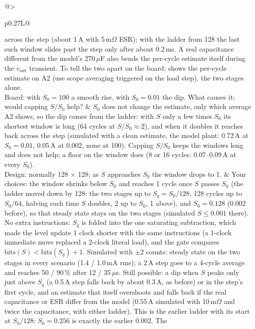 \documentclass[11pt]{article}
\newcommand{\code}[1]{\texttt{\detokenize{#1}}}
\begin{document}
{\begin{xltabular}{\linewidth}{@{}>{\raggedright\arraybackslash}p{0.27\linewidth}L@{}}
    across the step (about 1\,A with 5\,m$\Omega$ ESR); with the ladder
    from 128 the last such window slides past the step only after about
    0.2\,ms. A real capacitance different from the model's 270\,$\mu$F
    also bends the per-cycle estimate itself during the $v_\mathrm{out}$
    transient. To tell the two apart on the board: \code{tune.iload_s0 =
    0} shows the per-cycle estimate on A2 (use scope averaging triggered
    on the load step), \code{tune.iload_s0 = 1e30} the two stages
    alone. \\
Board: with $S_0 = 100$ a smooth rise, with $S_0 = 0.01$ the dip. What
causes it; would capping $S/S_0$ help?
  & $S_0$ does not change the estimate, only which average A2 shows, so
    the dip comes from the ladder: with $S$ only a few times $S_0$ its
    shortest window is long (64 cycles at $S/S_0\approx 2$), and when it
    doubles it reaches back across the step (simulated with a clean
    estimate, the model plant: 0.72\,A at $S_0=0.01$, 0.05\,A at 0.002,
    none at 100).
    Capping $S/S_0$ keeps the windows long and does not help; a floor on
    the window does (8 or 16 cycles: 0.07--0.09\,A at every $S_0$). \\
Design: normally 128 $\times$ 128; as $S$ approaches $S_0$ the window
drops to 1.
  & Your choices: the window shrinks below $S_0$ and reaches 1 cycle
    once $S$ passes $S_0$ (the ladder moved down by 128: the two stages
    up to $S_q=S_0/128$, 128 cycles up to $S_0/64$, halving each time $S$
    doubles, 2 up to $S_0$, 1 above), and $S_0 = 0.128$ (0.002 before),
    so that steady state stays on the two stages (simulated $S\le 0.001$
    there). No extra instructions: $S_q$ is folded into the one saturating
    subtraction, which made the level update 1 clock shorter with the same
    instructions (a 1-clock immediate move replaced a 2-clock literal
    load), and the gate compares
    $\mathrm{bits}(S) < \mathrm{bits}(S_q)+1$. Simulated with $\pm2$
    counts: steady state on the two stages in every scenario (1.4 /
    1.0\,mA rms); a 2\,A step goes to a 4-cycle average and reaches 50 /
    90\,\% after 12 / 35\,$\mu$s. Still possible: a dip when $S$ peaks only
    just above $S_q$ (a 0.5\,A step falls back by about 0.3\,A, as
    before) or in the step's first cycle, and an estimate that itself
    overshoots and falls back if the real capacitance or ESR differ from
    the model (0.55\,A simulated with 10\,m$\Omega$ and twice the
    capacitance, with either ladder). This is the earlier ladder with its
    start at $S_0/128$: $S_0 = 0.256$ is exactly the earlier 0.002. The

\end{xltabular}}
\end{document}
